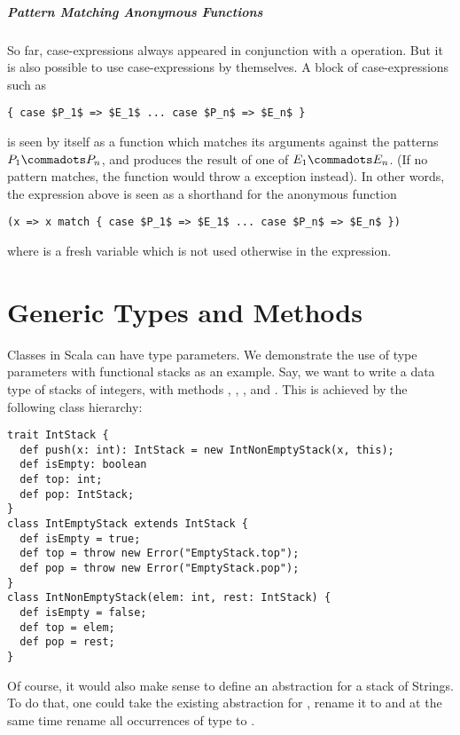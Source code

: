 \paragraph{Pattern Matching Anonymous Functions}

So far, case-expressions always appeared in conjunction with a
\verb@match@ operation. But it is also possible to use
case-expressions by themselves. A block of case-expressions such as
\begin{lstlisting}
{ case $P_1$ => $E_1$ ... case $P_n$ => $E_n$ }
\end{lstlisting}
is seen by itself as a function which matches its arguments
against the patterns $P_1 \commadots P_n$, and produces the result of
one of $E_1 \commadots E_n$. (If no pattern matches, the function
would throw a  exception instead).
In other words, the expression above is seen as a shorthand for the anonymous function
\begin{lstlisting}
(x => x match { case $P_1$ => $E_1$ ... case $P_n$ => $E_n$ })
\end{lstlisting}
where  is a fresh variable which is not used 
otherwise in the expression.

\chapter{Generic Types and Methods}

Classes in Scala can have type parameters. We demonstrate the use of
type parameters with functional stacks as an example. Say, we want to
write a data type of stacks of integers, with methods ,
, , and . This is achieved by the
following class hierarchy:
\begin{lstlisting}
trait IntStack {
  def push(x: int): IntStack = new IntNonEmptyStack(x, this);
  def isEmpty: boolean
  def top: int;
  def pop: IntStack;
}
class IntEmptyStack extends IntStack {
  def isEmpty = true;
  def top = throw new Error("EmptyStack.top");
  def pop = throw new Error("EmptyStack.pop");
}
class IntNonEmptyStack(elem: int, rest: IntStack) {
  def isEmpty = false;
  def top = elem;
  def pop = rest;
}
\end{lstlisting}
Of course, it would also make sense to define an abstraction for a
stack of Strings. To do that, one could take the existing abstraction
for , rename it to  and at the same
time rename all occurrences of type  to .

